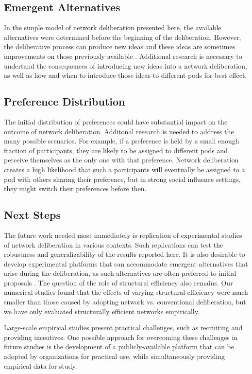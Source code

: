 \subsection{Emergent Alternatives}
In the simple model of network deliberation presented here, the available alternatives were determined before the beginning of the deliberation.
However, the deliberative process can produce new ideas and these ideas are sometimes
improvements on those previously available \cite{salganik_wiki_2015}.
Additional research is necessary to undertand the consequences of introducing new ideas into a network deliberation, as well as how and when to introduce those ideas to different pods for best effect.

\subsection{Preference Distribution}
The initial distribution of preferences could have substantial impact on the outcome of network deliberation.
Additonal research is needed to address the many possible scenarios.
For example, if a preference is held by a small enough fraction of participants, they are likely to be assigned to different pods and perceive themselves as the only one with that preference.
Network deliberation creates a high likelihood that such a participants will eventually
be assigned to a pod with others sharing their preference, but in strong social influence settings, they might switch their preferences before then.

\subsection{Next Steps}
The future work needed most immediately is replication of experimental studies of network
deliberation in various contexts.
Such replications can test the robustness and generalizability of the results reported here.
It is also desirable to develop experimental platforms that can accommodate emergent alternatives
that arise during the deliberation, as such alternatives are often preferred to initial proposals
\cite{salganik_wiki_2015}.
The question of the role of structural efficiency also remains.
Our numerical studies found that the effects of varying structural efficiency were much smaller
than those caused by adopting network vs. conventional deliberation,
but we have only evaluated structurally efficient networks empirically.

Large-scale empirical studies present practical challenges, such as recruiting and providing incentives.
One possible approach for overcoming these challenges in future studies is the development
of a publicly-available platform that can be adopted by organizations for practical use,
while simultaneously providing empirical data for study.

